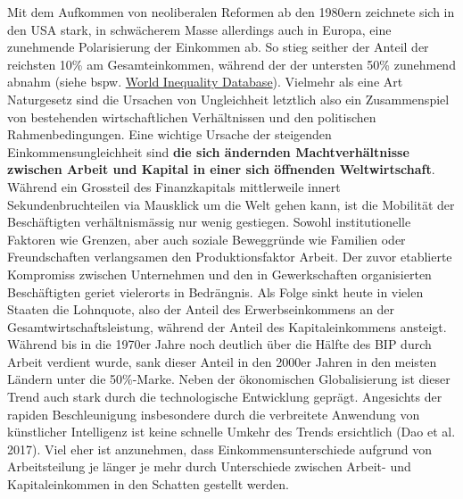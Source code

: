 \documentclass[
  nswissgerman,
  a4paper,
  DIV=11,
  numbers=noendperiod,
  oneside,
  openany]{scrreprt}
\begin{document}
Mit dem Aufkommen von neoliberalen Reformen ab den 1980ern zeichnete
sich in den USA stark, in schwächerem Masse allerdings auch in Europa,
eine zunehmende Polarisierung der Einkommen ab. So stieg seither der
Anteil der reichsten 10\% am Gesamteinkommen, während der der untersten
50\% zunehmend abnahm (siehe bspw. \href{https://wid.world/}{World
Inequality Database}). Vielmehr als eine Art Naturgesetz sind die
Ursachen von Ungleichheit letztlich also ein Zusammenspiel von
bestehenden wirtschaftlichen Verhältnissen und den politischen
Rahmenbedingungen. Eine wichtige Ursache der steigenden
Einkommensungleichheit sind \textbf{die sich ändernden Machtverhältnisse
zwischen Arbeit und Kapital in einer sich öffnenden Weltwirtschaft}.
Während ein Grossteil des Finanzkapitals mittlerweile innert
Sekundenbruchteilen via Mausklick um die Welt gehen kann, ist die
Mobilität der Beschäftigten verhältnismässig nur wenig gestiegen. Sowohl
institutionelle Faktoren wie Grenzen, aber auch soziale Beweggründe wie
Familien oder Freundschaften verlangsamen den Produktionsfaktor Arbeit.
Der zuvor etablierte Kompromiss zwischen Unternehmen und den in
Gewerkschaften organisierten Beschäftigten geriet vielerorts in
Bedrängnis. Als Folge sinkt heute in vielen Staaten die Lohnquote, also
der Anteil des Erwerbseinkommens an der Gesamtwirtschaftsleistung,
während der Anteil des Kapitaleinkommens ansteigt. Während bis in die
1970er Jahre noch deutlich über die Hälfte des BIP durch Arbeit verdient
wurde, sank dieser Anteil in den 2000er Jahren in den meisten Ländern
unter die 50\%-Marke. Neben der ökonomischen Globalisierung ist dieser
Trend auch stark durch die technologische Entwicklung geprägt.
Angesichts der rapiden Beschleunigung insbesondere durch die verbreitete
Anwendung von künstlicher Intelligenz ist keine schnelle Umkehr des
Trends ersichtlich (Dao et al. 2017). Viel eher ist anzunehmen, dass
Einkommensunterschiede aufgrund von Arbeitsteilung je länger je mehr
durch Unterschiede zwischen Arbeit- und Kapitaleinkommen in den Schatten
gestellt werden.
\end{document}
